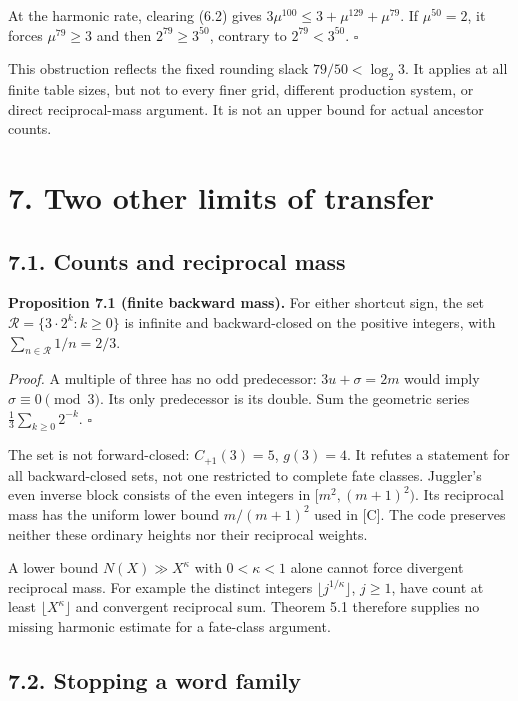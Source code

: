 \documentclass[11pt,a4paper]{article}
\begin{document}
At the harmonic rate, clearing (6.2) gives
\(3\mu^{100}\le3+\mu^{129}+\mu^{79}\). If \(\mu^{50}=2\), it forces
\(\mu^{79}\ge3\) and then \(2^{79}\ge3^{50}\), contrary to
\(2^{79}<3^{50}\). \(\square\)

This obstruction reflects the fixed rounding slack \(79/50<\log_2 3\).
It applies at all finite table sizes, but not to every finer grid,
different production system, or direct reciprocal-mass argument. It is
not an upper bound for actual ancestor counts.

\section{7. Two other limits of
transfer}\label{two-other-limits-of-transfer}

\subsection{7.1. Counts and reciprocal
mass}\label{counts-and-reciprocal-mass}

\textbf{Proposition 7.1 (finite backward mass).} For either shortcut
sign, the set \(\mathcal R=\{3\cdot2^k:k\ge0\}\) is infinite and
backward-closed on the positive integers, with
\(\sum_{n\in\mathcal R}1/n=2/3\).

\emph{Proof.} A multiple of three has no odd predecessor:
\(3u+\sigma=2m\) would imply \(\sigma\equiv0\pmod3\). Its only
predecessor is its double. Sum the geometric series
\(\frac13\sum_{k\ge0}2^{-k}\). \(\square\)

The set is not forward-closed: \(C_{+1}(3)=5\), \(g(3)=4\). It refutes a
statement for all backward-closed sets, not one restricted to complete
fate classes. Juggler's even inverse block consists of the even integers
in \([m^2,(m+1)^2)\). Its reciprocal mass has the uniform lower bound
\(m/(m+1)^2\) used in {[}C{]}. The code preserves neither these ordinary
heights nor their reciprocal weights.

A lower bound \(N(X)\gg X^\kappa\) with \(0<\kappa<1\) alone cannot
force divergent reciprocal mass. For example the distinct integers
\(\lfloor j^{1/\kappa}\rfloor\), \(j\ge1\), have count at least
\(\lfloor X^\kappa\rfloor\) and convergent reciprocal sum. Theorem 5.1
therefore supplies no missing harmonic estimate for a fate-class
argument.

\subsection{7.2. Stopping a word family}\label{stopping-a-word-family}
\end{document}
